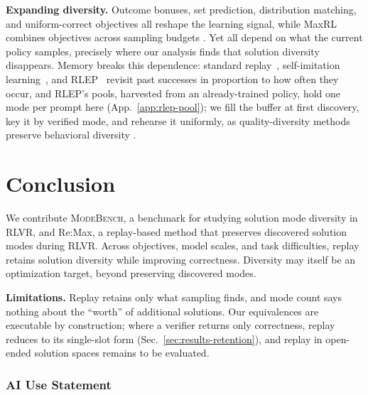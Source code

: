 \documentclass{article}
\newcommand{\1}{\mathbf 1}
\newcommand{\mb}{\textsc{ModeBench}}
\theoremstyle{remark}
\theoremstyle{definition}
\theoremstyle{plain}
\begin{document}
\textbf{Expanding diversity.}
Outcome bonuses, set prediction, distribution matching, and uniform-correct objectives all reshape the learning signal\citep{song2025outcome,chen2025passktraining,li2025divergence,li2026setpo,li2026distribution,lochab2026ucpo}, while MaxRL combines objectives across sampling budgets \citep{tajwar2026maxrl}.
Yet all depend on what the current policy samples, precisely where our analysis finds that solution diversity disappears.
Memory breaks this dependence: standard replay~\citep{lin1992selfimproving,rolnick2019replay}, self-imitation learning~\citep{oh2018self}, and RLEP~\citep{zhang2025rlep} revisit past successes in proportion to how often they occur, and RLEP's pools, harvested from an already-trained policy, hold one mode per prompt here (App.~\ref{app:rlep-pool}); we fill the buffer at first discovery, key it by verified mode, and rehearse it uniformly, as quality-diversity methods preserve behavioral diversity \citep{mouret2015illuminating,ecoffet2021return}.



\section{Conclusion}
\label{sec:conclusion}
\label{sec:discussion}
\label{sec:limitations}



We contribute \mb{}, a benchmark for studying solution mode diversity in RLVR, and Re:Max, a replay-based method that preserves discovered solution modes during RLVR.
Across objectives, model scales, and task difficulties, replay retains solution diversity while improving correctness. Diversity may itself be an optimization target, beyond preserving discovered modes.

\textbf{Limitations.} Replay retains only what sampling finds, and mode count says nothing about the ``worth'' of additional solutions. Our equivalences are executable by construction; where a verifier returns only correctness, replay reduces to its single-slot form (Sec.~\ref{sec:results-retention}), and replay in open-ended solution spaces remains to be evaluated.


\label{sec:main-end}
\clearpage
\subsubsection*{AI Use Statement}
\label{sec:ai-use}
\end{document}
